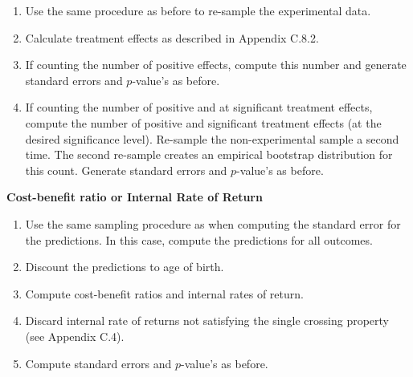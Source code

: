 \documentclass[static]{JJH-Beamer}
\begin{document}
\begin{frame}
 \addtocounter{framenumber}{-1}

\begin{enumerate}
\item Use the same procedure as before to re-sample the experimental data.
\item Calculate treatment effects as described in Appendix C.8.2.
\item If counting the number of positive effects, compute this number and generate standard errors and $p$-value's as before.
\item If counting the number of positive and at significant treatment effects, compute the number of positive and significant treatment effects (at the desired significance level). Re-sample the non-experimental sample a second time. The second re-sample creates an empirical bootstrap distribution for this count. Generate standard errors and $p$-value's as before.
\end{enumerate}

\end{frame}

\clearpage

\begin{frame}
 \addtocounter{framenumber}{-1}

\begin{center}
\textbf{Cost-benefit ratio or Internal Rate of Return}
\end{center}

\end{frame}

\begin{frame}
 \addtocounter{framenumber}{-1}

\begin{enumerate}

\item Use the same sampling procedure as when computing the standard error for the predictions. In this case, compute the predictions for all outcomes.
\item Discount the predictions to age of birth.
\item Compute cost-benefit ratios and internal rates of return.
\item Discard internal rate of returns not satisfying the single crossing property (see Appendix C.4).
\item Compute standard errors and $p$-value's as before.
\end{enumerate}

\end{frame}
\end{document}
